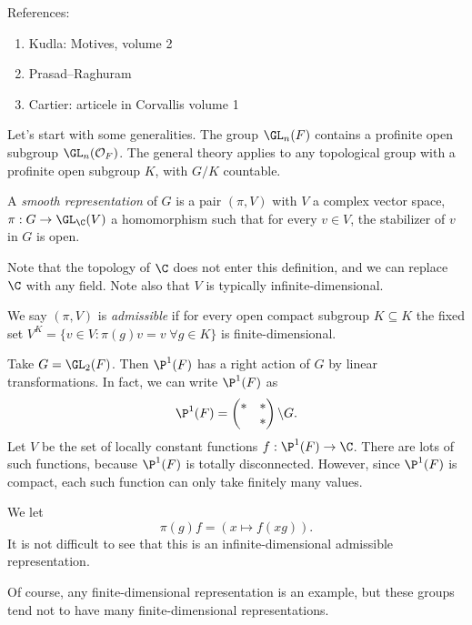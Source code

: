 \documentclass[a4paper]{article}
\begin{document}
References:
\begin{enumerate}
  \item Kudla: Motives, volume 2
  \item Prasad--Raghuram
  \item Cartier: articele in Corvallis volume 1
\end{enumerate}

Let's start with some generalities. The group $\GL_n(F)$ contains a profinite open subgroup $\GL_n(\mathcal{O}_F)$. The general theory applies to any topological group with a profinite open subgroup $K$, with $G/K$ countable.

\begin{defi}
  A \emph{smooth representation} of $G$ is a pair $(\pi, V)$ with $V$ a complex vector space, $\pi: G \to \GL_\C(V)$ a homomorphism such that for every $v \in V$, the stabilizer of $v$ in $G$ is open.
\end{defi}
Note that the topology of $\C$ does not enter this definition, and we can replace $\C$ with any field. Note also that $V$ is typically infinite-dimensional.

\begin{defi}
  We say $(\pi, V)$ is \emph{admissible} if for every open compact subgroup $K \subseteq K$ the fixed set $V^K = \{v \in V: \pi(g)v = v\;\forall g \in K\}$ is finite-dimensional.
\end{defi}

\begin{eg}
  Take $G = \GL_2(F)$. Then $\P^1(F)$ has a right action of $G$ by linear transformations. In fact, we can write $\P^1(F)$ as
  \[
    \P^1(F) =
    \begin{pmatrix}
      * & *\\
      & *
    \end{pmatrix} \backslash G.
  \]
  Let $V$ be the set of locally constant functions $f: \P^1(F) \to \C$. There are lots of such functions, because $\P^1(F)$ is totally disconnected. However, since $\P^1(F)$ is compact, each such function can only take finitely many values.

  We let
  \[
    \pi(g) f = (x \mapsto f(xg)).
  \]
  It is not difficult to see that this is an infinite-dimensional admissible representation. 
\end{eg}
Of course, any finite-dimensional representation is an example, but these groups tend not to have many finite-dimensional representations.
\end{document}
